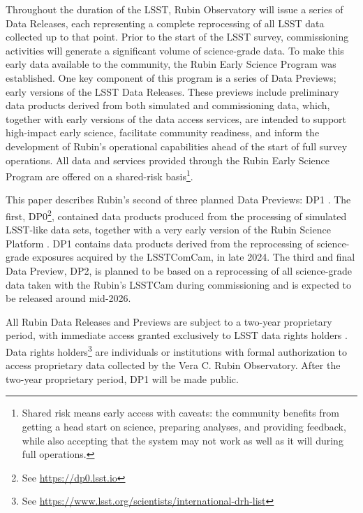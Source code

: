 Throughout the duration of the \gls{LSST},  Rubin Observatory will issue a series of Data Releases, each representing a complete reprocessing of all \gls{LSST} data collected up to that point.
Prior to the start of the \gls{LSST} survey, commissioning activities will generate a significant volume of science-grade data.
To make this early data available to the community, the Rubin Early Science Program \citep{RTN-011} was established.
One key component of this program is a series of Data Previews; early versions of the \gls{LSST} Data Releases.
These previews include preliminary data products derived from both simulated and commissioning data, which, together with early versions of the data access services, are intended to support high-impact early science, facilitate community readiness, and inform the development of Rubin’s operational capabilities ahead of the start of full survey operations.
All data and services provided through the Rubin Early Science Program are offered on a shared-risk basis\footnote{Shared risk means early access with caveats: the community benefits from getting a head start on science, preparing analyses, and providing feedback, while also accepting that the system may not work as well as it will during full operations.}.

This paper describes Rubin's second of three planned Data Previews: \gls{DP1} \citep{10.71929/rubin/2570308}.
The first, \gls{DP0}\footnote{See \url{https://dp0.lsst.io}}, contained data products produced from the processing of simulated \gls{LSST}-like data sets, together with a very early version of the Rubin \gls{Science Platform} \citep{LSE-319}.
\gls{DP1} contains data products derived from the reprocessing of science-grade exposures acquired by the \gls{LSSTComCam}, in late 2024.
The third and final Data Preview, \gls{DP2}, is planned to be based on a reprocessing of all science-grade data taken with the Rubin's \gls{LSSTCam} during commissioning and is expected to be released around mid-2026.

All Rubin Data Releases and Previews are subject to a two-year proprietary period, with immediate access granted exclusively to LSST data rights holders \citep{rdo-013}.
Data rights holders\footnote{See \url{https://www.lsst.org/scientists/international-drh-list}} are individuals or institutions with formal authorization to access proprietary data collected by the Vera C. Rubin Observatory.
After the two-year proprietary period, \gls{DP1} will be made public.

